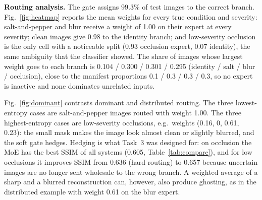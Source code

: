 \documentclass[conference]{IEEEtran}
\begin{document}
\textbf{Routing analysis.} The gate assigns 99.3\% of test images to the correct branch. Fig.~\ref{fig:heatmap}
reports the mean weights for every true condition and severity: salt-and-pepper and blur receive a weight of 1.00 on
their expert at every severity; clean images give 0.98 to the identity branch; and low-severity occlusion is the only
cell with a noticeable split (0.93 occlusion expert, 0.07 identity), the same ambiguity that the classifier showed.
The share of images whose largest weight goes to each branch is 0.104 / 0.300 / 0.301 / 0.295 (identity / salt /
blur / occlusion), close to the manifest proportions 0.1 / 0.3 / 0.3 / 0.3, so no expert is inactive and none
dominates unrelated inputs.

Fig.~\ref{fig:dominant} contrasts dominant and distributed routing. The three lowest-entropy cases are
salt-and-pepper images routed with weight 1.00. The three highest-entropy cases are low-severity occlusions, e.g.\
weights (0.16, 0, 0.61, 0.23): the small mask makes the image look almost clean or slightly blurred, and the soft
gate hedges. Hedging is what Task~3 was designed for: on occlusion the MoE has the best SSIM of all systems
(0.605, Table~\ref{tab:compare}), and for low occlusions it improves SSIM from 0.636 (hard routing) to 0.657 because
uncertain images are no longer sent wholesale to the wrong branch. A weighted average of a sharp and a blurred
reconstruction can, however, also produce ghosting, as in the distributed example with weight 0.61 on the blur
expert.

\end{document}
